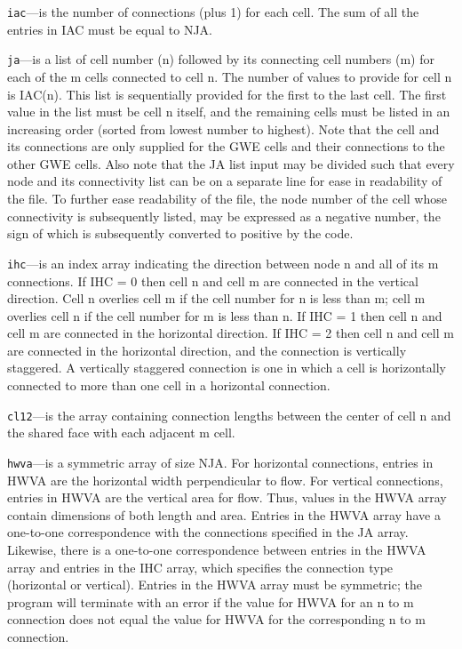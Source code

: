 \begin{description}
\item \texttt{iac}---is the number of connections (plus 1) for each cell.  The sum of all the entries in IAC must be equal to NJA.

\item \texttt{ja}---is a list of cell number (n) followed by its connecting cell numbers (m) for each of the m cells connected to cell n. The number of values to provide for cell n is IAC(n).  This list is sequentially provided for the first to the last cell. The first value in the list must be cell n itself, and the remaining cells must be listed in an increasing order (sorted from lowest number to highest).  Note that the cell and its connections are only supplied for the GWE cells and their connections to the other GWE cells.  Also note that the JA list input may be divided such that every node and its connectivity list can be on a separate line for ease in readability of the file. To further ease readability of the file, the node number of the cell whose connectivity is subsequently listed, may be expressed as a negative number, the sign of which is subsequently converted to positive by the code.

\item \texttt{ihc}---is an index array indicating the direction between node n and all of its m connections.  If IHC = 0 then cell n and cell m are connected in the vertical direction.  Cell n overlies cell m if the cell number for n is less than m; cell m overlies cell n if the cell number for m is less than n.  If IHC = 1 then cell n and cell m are connected in the horizontal direction.  If IHC = 2 then cell n and cell m are connected in the horizontal direction, and the connection is vertically staggered.  A vertically staggered connection is one in which a cell is horizontally connected to more than one cell in a horizontal connection.

\item \texttt{cl12}---is the array containing connection lengths between the center of cell n and the shared face with each adjacent m cell.

\item \texttt{hwva}---is a symmetric array of size NJA.  For horizontal connections, entries in HWVA are the horizontal width perpendicular to flow.  For vertical connections, entries in HWVA are the vertical area for flow.  Thus, values in the HWVA array contain dimensions of both length and area.  Entries in the HWVA array have a one-to-one correspondence with the connections specified in the JA array.  Likewise, there is a one-to-one correspondence between entries in the HWVA array and entries in the IHC array, which specifies the connection type (horizontal or vertical).  Entries in the HWVA array must be symmetric; the program will terminate with an error if the value for HWVA for an n to m connection does not equal the value for HWVA for the corresponding n to m connection.


\end{description}
